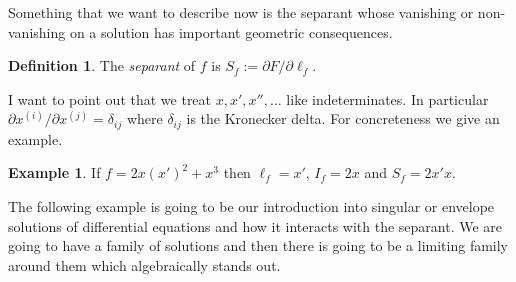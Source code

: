 \documentclass[12pt]{book}
\numberwithin{equation}{section}
\theoremstyle{definition}
\newtheorem{definition}[theorem]{Definition}
\newtheorem{example}[theorem]{Example}
\theoremstyle{remark}
\begin{document}
Something that we want to describe now is the separant whose vanishing or non-vanishing on a solution has important geometric consequences.

\begin{definition}
	The \emph{separant} of $f$ is $S_f:=\partial F/\partial \ell_f$. 
\end{definition}

I want to point out that we treat $x,x',x'',\ldots$ like indeterminates. 
In particular $\partial x^{(i)}/\partial x^{(j)} = \delta_{ij}$ where $\delta_{ij}$ is the Kronecker delta. 
For concreteness we give an example.
\begin{example}
	If $f = 2x(x')^2 + x^3$ then $\ell_f = x'$, $I_f = 2x$ and $S_f = 2x'x$. 
\end{example}

The following example is going to be our introduction into singular or envelope solutions of differential equations and how it interacts with the separant.
We are going to have a family of solutions and then there is going to be a limiting family around them which algebraically stands out.
\end{document}
